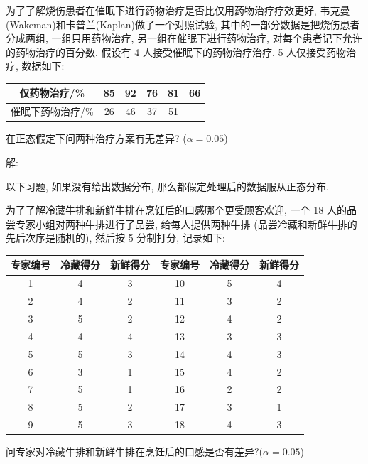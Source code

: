 \documentclass[standard]{ExBook}
\begin{document}
\begin{qitems}
    \begin{bbox}
    \begin{shaded}
        \qitem
为了了解烧伤患者在催眠下进行药物治疗是否比仅用药物治疗疗效更好, 韦克曼(Wakeman)和卡普兰(Kaplan)做了一个对照试验, 其中的一部分数据是把烧伤患者分成两组, 一组只用药物治疗, 另一组在催眠下进行药物治疗, 对每个患者记下允许的药物治疗的百分数. 假设有 4 人接受催眠下的药物治疗治疗, 5 人仅接受药物治疗, 数据如下:
\begin{center}
\setlength{\tabcolsep}{27pt}
\begin{tabular}{c|ccccc}
\hline
仅药物治疗/\% & 85 & 92 & 76 & 81 & 66 \\
\hline
催眠下药物治疗/\% & 26 & 46 & 37 & 51 & \\
\hline
\end{tabular}
\end{center}
在正态假定下问两种治疗方案有无差异? ($\alpha = 0.05$)
    \end{shaded}
    \end{bbox}

\vspace{-5em}

    \begin{bbox}
解: 
    \end{bbox}

\vspace{3em}

    \begin{center}
以下习题, 如果没有给出数据分布, 那么都假定处理后的数据服从正态分布.
    \end{center}

    \begin{bbox}
    \begin{shaded}
        \qitem
为了了解冷藏牛排和新鲜牛排在烹饪后的口感哪个更受顾客欢迎, 一个 18 人的品尝专家小组对两种牛排进行了品尝, 给每人提供两种牛排 (品尝冷藏和新鲜牛排的先后次序是随机的), 然后按 5 分制打分, 记录如下:
\begin{center}
\renewcommand{\arraystretch}{1}
\setlength{\tabcolsep}{16pt}
\begin{tabular}{c|cc||c|cc}
\hline
专家编号 & 冷藏得分 & 新鲜得分 & 专家编号 & 冷藏得分 & 新鲜得分 \\
\hline
1 & 4 & 3 & 10 & 5 & 4 \\
2 & 4 & 2 & 11 & 3 & 2 \\
3 & 5 & 2 & 12 & 4 & 2 \\
4 & 4 & 4 & 13 & 3 & 3 \\
5 & 5 & 3 & 14 & 4 & 3 \\
6 & 3 & 1 & 15 & 4 & 2 \\
7 & 5 & 1 & 16 & 2 & 2 \\
8 & 5 & 2 & 17 & 3 & 1 \\
9 & 5 & 3 & 18 & 4 & 3 \\
\hline
\end{tabular}
\end{center}
问专家对冷藏牛排和新鲜牛排在烹饪后的口感是否有差异?($\alpha = 0.05$)
    \end{shaded}
    \end{bbox}


\end{qitems}
\end{document}
